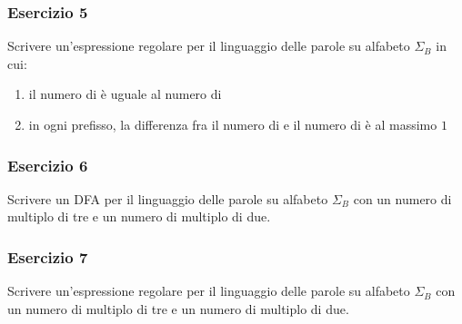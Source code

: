 \begin{frame}
\frametitle{Esercizio 5}
Scrivere un'espressione regolare per il linguaggio delle parole su alfabeto $\Sigma_{B}$ in cui:
\begin{enumerate}
\item il numero di \zero è uguale al numero di \uno
\item in ogni prefisso, la differenza fra il numero di \zero e il numero di \uno è al massimo $1$
\end{enumerate}
\end{frame}


\begin{frame}
\frametitle{Esercizio 6}
Scrivere un DFA per il linguaggio delle parole su alfabeto $\Sigma_{B}$ con
un numero di \uno multiplo di tre e un numero di \zero multiplo di due.
\end{frame}


\begin{frame}
\frametitle{Esercizio 7}
Scrivere un'espressione regolare per il linguaggio delle parole su alfabeto $\Sigma_{B}$ con
un numero di \uno multiplo di tre e un numero di \zero multiplo di due.
\end{frame}



